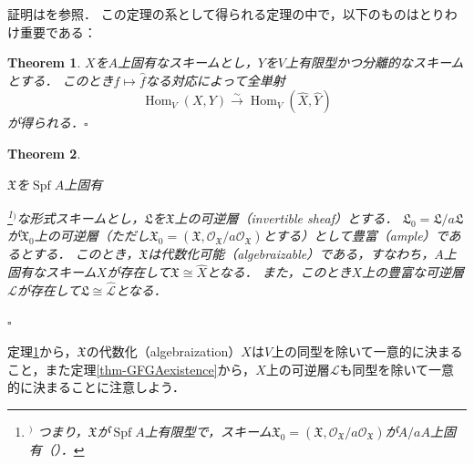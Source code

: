 \documentclass[a4paper,12pt, dvipdfmx]{jsbook}
\def\O{\mathscr{O}}
\def\Spf{\mathop{\mathrm{Spf}}\nolimits}
\def\Hom{\mathop{\mathrm{Hom}}\nolimits}
\theoremstyle{plain}
\newtheorem{thm}{\bfseries Theorem}[section]
\theoremstyle{definition}
\newcounter{chushaku}
\def\chu#1{\addtocounter{chushaku}{1}\footnote[\value{chushaku}]{${}^)$ #1}${}^)$}
\begin{document}
証明は\cite[$\mathbf{III}$, \S5]{EGA}を参照．
この定理の系として得られる定理の中で，以下のものはとりわけ重要である：
\begin{thm}\label{thm-GFGAexistence1}{\rm 
$X$を$A$上固有なスキームとし，$Y$を$V$上有限型かつ分離的なスキームとする．
このとき$f\mapsto\widehat{f}$なる対応によって全単射
$$
\Hom_V(X,Y)\stackrel{\sim}{\longrightarrow}\Hom_V(\widehat{X},\widehat{Y})
$$
が得られる．}\hfill$\square$
\end{thm}

\begin{thm}\label{thm-GFGAexistence2}{\rm 
$\mathfrak{X}$を$\Spf A$上固有\chu{つまり，$\mathfrak{X}$が$\Spf A$上有限型で，スキーム$\mathfrak{X}_0=(\mathfrak{X},\O_{\mathfrak{X}}/a\O_{\mathfrak{X}})$が$A/aA$上固有（\cite[$\mathbf{III}$, (3.4.1)]{EGA}）．}な形式スキームとし，$\mathfrak{L}$を$\mathfrak{X}$上の可逆層（invertible sheaf）とする．
$\mathfrak{L}_0=\mathfrak{L}/a\mathfrak{L}$が$\mathfrak{X}_0$上の可逆層（ただし$\mathfrak{X}_0=(\mathfrak{X},\O_{\mathfrak{X}}/a\O_{\mathfrak{X}})$とする）として豊富（ample）であるとする．
このとき，$\mathfrak{X}$は代数化可能（algebraizable）である，すなわち，$A$上固有なスキーム$X$が存在して$\mathfrak{X}\cong\widehat{X}$となる．
また，このとき$X$上の豊富な可逆層$\mathscr{L}$が存在して$\mathfrak{L}\cong\widehat{\mathscr{L}}$となる．}\hfill$\square$
\end{thm}

定理\ref{thm-GFGAexistence1}から，$\mathfrak{X}$の代数化（algebraization）$X$は$V$上の同型を除いて一意的に決まること，また定理\ref{thm-GFGAexistence}から，$X$上の可逆層$\mathscr{L}$も同型を除いて一意的に決まることに注意しよう．
\end{document}
